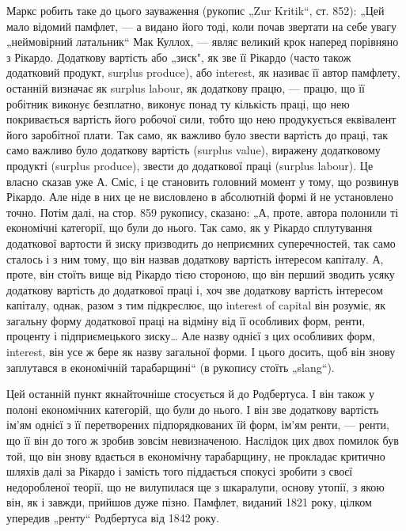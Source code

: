 Маркс робить таке до цього зауваження (рукопис „Zur Kritik“,
ст. 852): „Цей мало відомий памфлет, — а видано його тоді, коли почав
звертати на себе увагу „неймовірний латальник“ Мак Куллох, — являє
великий крок наперед порівняно з Рікардо. Додаткову вартість або
„зиск", як зве її Рікардо (часто також додатковий продукт, surplus
produce), або interest, як називає її автор памфлету, останній визначає як
surplus labour, як додаткову працю, — працю, що її робітник виконує безплатно,
виконує понад ту кількість праці, що нею покривається вартість
його робочої сили, тобто що нею продукується еквівалент його заробітної
плати. Так само, як важливо було звести вартість до праці, так
само важливо було додаткову вартість (surplus value), виражену додатковому
продукті (surplus produce), звести до додаткової праці
(surplus labour). Це власно сказав уже А. Сміс, і це становить головний
момент у тому, що розвинув Рікардо. Але ніде в них це не
висловлено в абсолютній формі й не установлено точно. Потім далі, на
стор. 859 рукопису, сказано: „А, проте, автора полонили ті економічні
категорії, що були до нього. Так само, як у Рікардо сплутування додаткової
вартости й зиску призводить до неприємних суперечностей, так
само сталось і з ним тому, що він назвав додаткову вартість
інтересом капіталу. А, проте, він стоїть вище від Рікардо тією стороною, що
він перший зводить усяку додаткову вартість до додаткової праці і, хоч зве
додаткову вартість інтересом капіталу, однак, разом з тим підкреслює,
що interest of capital він розуміє, як загальну форму
додаткової праці на відміну від її особливих форм, ренти, проценту і
підприємецького зиску\dots{} Але назву однієї з цих особливих форм, interest,
він усе ж бере як назву загальної форми. І цього досить, щоб він знову
заплутався в економічній тарабарщині“ (в рукопису стоїть „slang“).

Цей останній пункт якнайточніше стосується й до Родбертуса. І він
також у полоні економічних категорій, що були до нього. І він зве
додаткову вартість ім’ям однієї з її перетворених підпорядкованих їй форм,
ім’ям ренти, — ренти, що її він до того ж зробив зовсім невизначеною.
Наслідок цих двох помилок був той, що він знову вдається в економічну
тарабарщину, не прокладає критично шляхів далі за Рікардо і замість
того піддається спокусі зробити з своєї недоробленої теорії, що не
вилупилася ще з шкаралупи, основу утопії, з якою він, як і завжди,
прийшов дуже пізно. Памфлет, виданий 1821 року, цілком упередив
„ренту“ Родбертуса від 1842 року.

